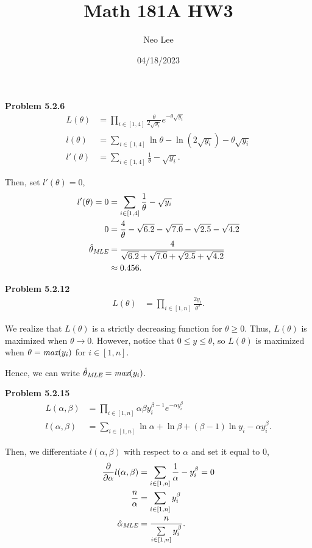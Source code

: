 \documentclass{article}
\title{Math 181A HW3}
\author{Neo Lee}
\date{04/18/2023}
\begin{document}
 

\maketitle 

\textbf{Problem 5.2.6}
\begin{align}
    L(\theta) & = \prod_{i \in [1,4]} \frac{\theta}{2\sqrt{y_i}}e^{-\theta\sqrt{y_i}} \nonumber \\
    l(\theta) & = \sum_{i\in [1,4]} \ln\theta - \ln(2\sqrt{y_i}) - \theta\sqrt{y_i} \nonumber \\
    l'(\theta) & = \sum_{i \in [1,4]} \frac{1}{\theta}  - \sqrt{y_i}. \nonumber 
\end{align}

Then, set $l'(\theta) = 0$,
\begin{align}
    l'(\theta) = 0 & = \sum_{i \in [1,4]} \frac{1}{\theta}  - \sqrt{y_i} \nonumber \\
    0 & = \frac{4}{\theta} - \sqrt{6.2} - \sqrt{7.0} - \sqrt{2.5} - \sqrt{4.2} \nonumber \\
    \hat{\theta}_{\emph{MLE}} & = \frac{4}{\sqrt{6.2} + \sqrt{7.0} + \sqrt{2.5} + \sqrt{4.2}} \nonumber \\
    & \approx 0.456. \nonumber 
\end{align}
\bigbreak

\textbf{Problem 5.2.12}
\begin{align}
    L(\theta) & = \prod_{i\in[1,n]}\frac{2y_i}{\theta^2}. \nonumber 
\end{align}

We realize that $L(\theta)$ is a strictly decreasing function for $\theta \ge 0$. 
Thus, $L(\theta)$ is maximized when $\theta \rightarrow 0$.
However, notice that $0 \le y \le \theta$, so $L(\theta)$ is maximized when $\theta = \emph{max}(y_i)$ for $i \in [1,n]$.

Hence, we can write $\hat{\theta}_{\emph{MLE}} = \emph{max}(y_i)$.
\bigbreak

\textbf{Problem 5.2.15}
\begin{align}
    L(\alpha, \beta) & = \prod_{i\in[1,n]}\alpha\beta y_i^{\beta-1}e^{-\alpha y_i^\beta} \nonumber \\
    l(\alpha, \beta) & = \sum_{i\in[1,n]} \ln\alpha + \ln\beta + (\beta-1)\ln y_i - \alpha y_i^\beta. \nonumber 
\end{align}

Then, we differentiate $l(\alpha, \beta)$ with respect to $\alpha$ and set it equal to 0,
\begin{align}
    \frac{\partial}{\partial\alpha}l(\alpha, \beta) & = \sum_{i\in[1,n]} \frac{1}{\alpha} - y_i^\beta = 0 \nonumber \\
    \frac{n}{\alpha} & = \sum_{i\in[1,n]} y_i^\beta \nonumber \\ 
    \hat{\alpha}_{\emph{MLE}} & = \frac{n}{\sum\limits_{i\in[1,n]} y_i^\beta}. \nonumber 
\end{align}
\bigbreak
\end{document}
